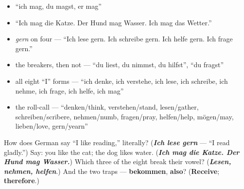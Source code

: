 \begin{itemize}
\raggedright
  \item \textquotedblleft{}ich mag, du magst, er mag\textquotedblright{}
  \item \textquotedblleft{}Ich mag die Katze. Der Hund mag Wasser. Ich mag das Wetter.\textquotedblright{}
  \item \emph{gern} on four — \textquotedblleft{}Ich lese gern. Ich schreibe gern. Ich helfe gern. Ich frage gern.\textquotedblright{}
  \item the breakers, then not — \textquotedblleft{}du liest, du nimmst, du hilfst\textquotedblright{}, \textquotedblleft{}du fragst\textquotedblright{}
  \item all eight \textquotedblleft{}I\textquotedblright{} forms — \textquotedblleft{}ich denke, ich verstehe, ich lese, ich schreibe, ich nehme, ich frage, ich helfe, ich mag\textquotedblright{}
  \item the roll-call — \textquotedblleft{}denken/think, verstehen/stand, lesen/gather, schreiben/scrībere, nehmen/numb, fragen/pray, helfen/help, mögen/may, lieben/love, gern/yearn\textquotedblright{}
\end{itemize}

\begin{tcolorbox}[breakable,colback=teal!4,colframe=teal!35!black,title={Before you move on}]
How does German say \textquotedblleft{}I like reading,\textquotedblright{} literally? (\emph{\textbf{Ich lese gern}} — \textquotedblleft{}I read gladly.\textquotedblright{}) Say: you like the cat; the dog likes water. (\emph{\textbf{Ich mag die Katze. Der Hund mag Wasser.}}) Which three of the eight break their vowel? (\emph{\textbf{Lesen, nehmen, helfen}}.) And the two traps — \textbf{bekommen}, \textbf{also}? (\textbf{Receive}; \textbf{therefore}.)
\end{tcolorbox}
